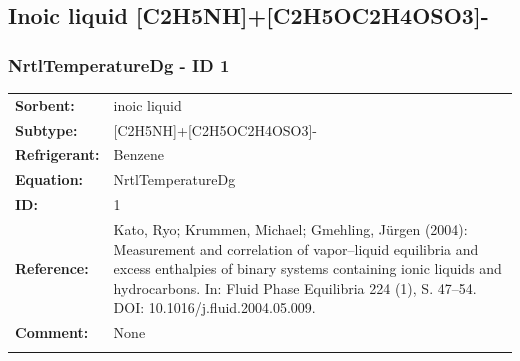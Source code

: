 \subsection{Inoic liquid [C2H5NH]+[C2H5OC2H4OSO3]-}
%
\subsubsection{NrtlTemperatureDg - ID 1}
%
\begin{tabular}[l]{|lp{11.5cm}|}
\hline
\addlinespace

\textbf{Sorbent:} & inoic liquid \\
\textbf{Subtype:} & [C2H5NH]+[C2H5OC2H4OSO3]- \\
\textbf{Refrigerant:} & Benzene \\
\textbf{Equation:} & NrtlTemperatureDg \\
\textbf{ID:} & 1 \\
\textbf{Reference:} & Kato, Ryo; Krummen, Michael; Gmehling, Jürgen (2004): Measurement and correlation of vapor–liquid equilibria and excess enthalpies of binary systems containing ionic liquids and hydrocarbons. In: Fluid Phase Equilibria 224 (1), S. 47–54. DOI: 10.1016/j.fluid.2004.05.009. \\
\textbf{Comment:} & None \\

\addlinespace
\hline
\end{tabular}
\newline

